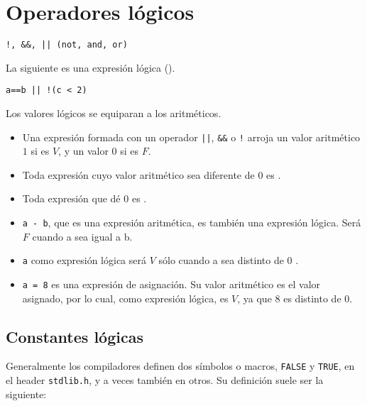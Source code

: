 \section{Operadores lógicos}
\begin{lstlisting}
!, &&, || (not, and, or)	
\end{lstlisting}

\begin{ejemplo}
La siguiente es una expresión lógica ().
\begin{lstlisting}
a==b || !(c < 2)    
\end{lstlisting}
\end{ejemplo}

Los valores lógicos se equiparan a los aritméticos. 
\begin{itemize}
	\item Una expresión formada con un operador \lstinline{||}, \lstinline{&&} o \lstinline{!} arroja un valor aritmético $1$ si es $V$, y un valor $0$ si es $F$. 
	\item Toda expresión cuyo valor aritmético sea diferente de $0$ es . 
	\item Toda expresión que dé $0$ es .
\end{itemize}

\begin{ejemplo}
\noindent
\begin{itemize}
\item \lstinline{a - b}, que es una expresión aritmética, es también una expresión lógica. Será $F$ cuando a sea igual a b.
\item \lstinline{a} como expresión lógica será $V$ sólo cuando a sea distinto de 0 .

\item \lstinline{a = 8} es una expresión de asignación. Su valor aritmético es el valor asignado, por lo cual, como expresión lógica, es $V$, ya que 8 es distinto de 0.

\end{itemize}
\end{ejemplo}

\subsection{Constantes lógicas}
Generalmente los compiladores definen dos símbolos o macros, \lstinline{FALSE} y \lstinline{TRUE}, en el header \lstinline{stdlib.h}, y a veces también en otros. Su definición suele ser la siguiente:

